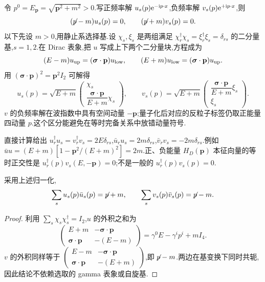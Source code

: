 令 $p^0=E_{\mathbf p}=\sqrt{\mathbf p^2+m^2}>0$.写正频率解 $u_s(p)\e^{-\ii p\cdot x}$,负频率解 $v_s(p)\e^{+\ii p\cdot x}$,则
\begin{equation}
 (\slashed p-m)u_s(p)=0,
 \qquad (\slashed p+m)v_s(p)=0.
\end{equation}
以下先设 $m>0$,用静止系选择基.设 $\chi_s,\xi_s$ 是两组满足 $\chi_r^\dagger\chi_s=\xi_r^\dagger\xi_s=\delta_{rs}$ 的二分量基,$s=1,2$.在 Dirac 表象,把 $u$ 写成上下两个二分量块,方程成为
\begin{equation}
 (E-m)u_{\rm up}=(\boldsymbol\sigma\cdot\mathbf p)u_{\rm low},
 \qquad (E+m)u_{\rm low}=(\boldsymbol\sigma\cdot\mathbf p)u_{\rm up}.
\end{equation}
用 $(\boldsymbol\sigma\cdot\mathbf p)^2=\mathbf p^2 I_2$ 可解得
\begin{equation}
 u_s(p)=\sqrt{E+m}\begin{pmatrix}\chi_s\\
 \dfrac{\boldsymbol\sigma\cdot\mathbf p}{E+m}\chi_s\end{pmatrix},
 \qquad
 v_s(p)=\sqrt{E+m}\begin{pmatrix}
 \dfrac{\boldsymbol\sigma\cdot\mathbf p}{E+m}\xi_s\\\xi_s\end{pmatrix}.
 \label{eq:uv-explicit}
\end{equation}
$v$ 的负频率解在波指数中具有空间动量 $-\mathbf p$;量子化后对应的反粒子标签仍取正能量四动量 $p$.这个区分能避免在等时完备关系中放错动量符号.

直接计算给出 $u_r^\dagger u_s=v_r^\dagger v_s=2E\delta_{rs}$,$\bar u_ru_s=2m\delta_{rs}$,$\bar v_rv_s=-2m\delta_{rs}$.例如 $\bar u u=(E+m)[1-\mathbf p^2/(E+m)^2]=2m$.正、负能量 $H_D(\mathbf p)$ 本征向量的等时正交性是 $u_r^\dagger(p)v_s(E,-\mathbf p)=0$;不是一般的 $u_r^\dagger(p)v_s(p)=0$.

\begin{proposition}[完备关系]
采用上述归一化,
\begin{equation}
 \sum_su_s(p)\bar u_s(p)=\slashed p+m,
 \qquad \sum_sv_s(p)\bar v_s(p)=\slashed p-m.
 \label{eq:dirac-spin-sums}
\end{equation}
\end{proposition}
\begin{proof}
利用 $\sum_s\chi_s\chi_s^\dagger=I_2$,$u$ 的外积之和为
\[
 \begin{pmatrix}
 E+m&-\boldsymbol\sigma\cdot\mathbf p\\
 \boldsymbol\sigma\cdot\mathbf p&-(E-m)
 \end{pmatrix}=\gamma^0E-\gamma^i p^i+mI_4.
\]
$v$ 的外积同样等于 $\left(\begin{smallmatrix}E-m&-\boldsymbol\sigma\cdot\mathbf p\\\boldsymbol\sigma\cdot\mathbf p&-(E+m)\end{smallmatrix}\right)$,即 $\slashed p-m$.两边在基变换下同时共轭,因此结论不依赖选取的 gamma 表象或自旋基.
\end{proof}

